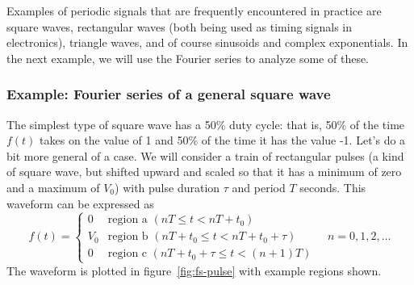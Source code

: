 Examples of periodic signals that are frequently encountered in
practice are square waves, rectangular waves (both being used as
timing signals in electronics), triangle waves, and of course
sinusoids and complex exponentials. In the next example, we will use
the Fourier series to analyze some of these.


\subsubsection*{Example: Fourier series of a general square wave}

 The simplest type of square
wave has a 50\% duty cycle: that is, 50\% of the time
$f(t)$ takes on the value of 1 and 50\% of the time it has the value
-1. Let's do a bit more general of a case. We will consider a train of
rectangular pulses (a kind of square wave, but shifted upward and
scaled so that it has a minimum of zero and a maximum of $V_0$) with
pulse duration $\tau$ and period $T$ seconds. This waveform can be
expressed as
\begin{equation}
f(t) = \left\{\begin{array}{ll}
        0   & \text{region a } (nT\leq t < nT+t_0) \\
        V_0 & \text{region b } (nT+t_0 \leq t < nT+t_0+\tau)\\
	0   & \text{region c } (nT+t_0+\tau \leq t < (n+1)T)
        \end{array}\right.
\quad n = 0 , 1, 2, \ldots
\end{equation}
The waveform is plotted in figure~\ref{fig:fs-pulse} with example regions shown. 

